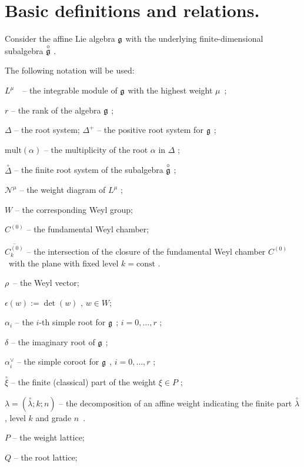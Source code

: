 \documentclass{article}
\begin{document}
\section{\protect\bigskip Basic definitions and relations.}

\bigskip

Consider the affine Lie algebra $\frak{g}$ with the underlying
finite-dimensional subalgebra $\overset{\circ }{\frak{g}}$ .

The following notation will be used:

$L^{\mu }$\ \ -- the integrable module of $\frak{g}$ with the highest weight
$\mu $\ ;

$r$ -- the rank of the algebra $\frak{g}$ ;

$\Delta $ -- the root system; $\Delta ^{+}$ -- the positive root system for $%
\frak{g}$ ;

$\mathrm{mult}\left( \alpha \right) $ -- the multiplicity of the root $%
\alpha $ in $\Delta $ ;

$\overset{\circ }{\Delta }$ -- the finite root system of the subalgebra $%
\overset{\circ }{\frak{g}}$ ;

$\mathcal{N}^{\mu }$ -- the weight diagram of $L^{\mu }$ ;

$W$ -- the corresponding Weyl group;

$C^{\left( 0\right) }$ -- the fundamental Weyl chamber;

$\overline{C_{k}^{\left( 0\right) }}$ -- the intersection of the closure of
the fundamental Weyl chamber $C^{\left( 0\right) }$\ with the plane with
fixed level $k=\mathrm{const}$ .

$\rho $\ -- the Weyl vector;

$\epsilon \left( w\right) :=\det \left( w\right) $ , $w \in W$;

$\alpha _{i}$ -- the $i$-th simple root for $\frak{g}$ ; $i=0,\ldots ,r$ ;

$\delta $ -- the imaginary root of $\frak{g}$ ;

$\alpha _{i}^{\vee }$ -- the simple coroot for $\frak{g}$ , $i=0,\ldots ,r$ ;

$\overset{\circ }{\xi }$ -- the finite (classical) part of the weight $\xi
\in P$ ;

$\lambda =\left( \overset{\circ }{\lambda };k;n\right) $ -- the
decomposition of an affine weight indicating the finite part $\overset{\circ
}{\lambda }$, level $k$ and grade $n$\ .

$P$ -- the weight lattice;

$Q$ -- the root lattice;
\end{document}

